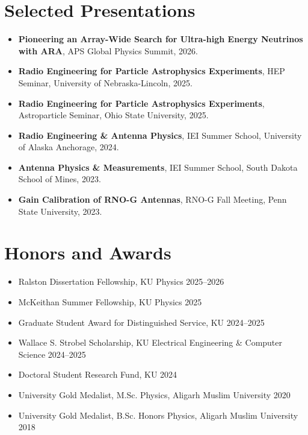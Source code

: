 \documentclass[10pt,letterpaper]{article}
\begin{document}
\section*{Selected Presentations}

\begin{itemize}
    \item \textbf{Pioneering an Array-Wide Search for Ultra-high Energy Neutrinos with ARA}, APS Global Physics Summit, 2026.
    \item \textbf{Radio Engineering for Particle Astrophysics Experiments}, HEP Seminar, University of Nebraska-Lincoln, 2025.
    \item \textbf{Radio Engineering for Particle Astrophysics Experiments}, Astroparticle Seminar, Ohio State University, 2025.
    \item \textbf{Radio Engineering \& Antenna Physics}, IEI Summer School, University of Alaska Anchorage, 2024.
    \item \textbf{Antenna Physics \& Measurements}, IEI Summer School, South Dakota School of Mines, 2023.
    \item \textbf{Gain Calibration of RNO-G Antennas}, RNO-G Fall Meeting, Penn State University, 2023.
\end{itemize}

\section*{Honors and Awards}

\begin{itemize}
    \item Ralston Dissertation Fellowship, KU Physics \hfill 2025--2026
    \item McKeithan Summer Fellowship, KU Physics \hfill 2025
    \item Graduate Student Award for Distinguished Service, KU \hfill 2024--2025
    \item Wallace S. Strobel Scholarship, KU Electrical Engineering \& Computer Science \hfill 2024--2025
    \item Doctoral Student Research Fund, KU \hfill 2024
    \item University Gold Medalist, M.Sc. Physics, Aligarh Muslim University \hfill 2020
    \item University Gold Medalist, B.Sc. Honors Physics, Aligarh Muslim University \hfill 2018
\end{itemize}
\end{document}
